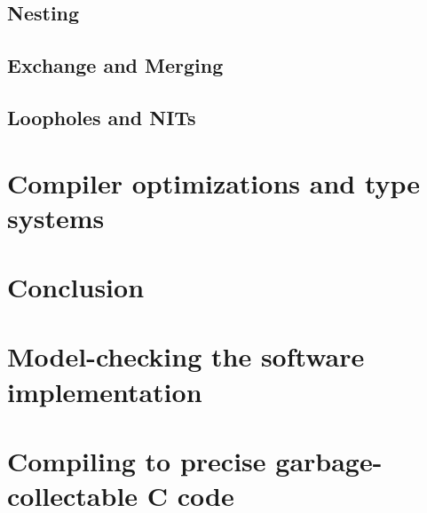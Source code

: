 \documentclass{phd-thesis}
\begin{document}
\section{Nesting}
\section{Exchange and Merging}
\section{Loopholes and NITs}

\chapter{Compiler optimizations and type systems}

\chapter{Conclusion}
\appendix
\chapter{Model-checking the software implementation}

\chapter{Compiling to precise garbage-collectable C code}

\backmatter

\end{document}
